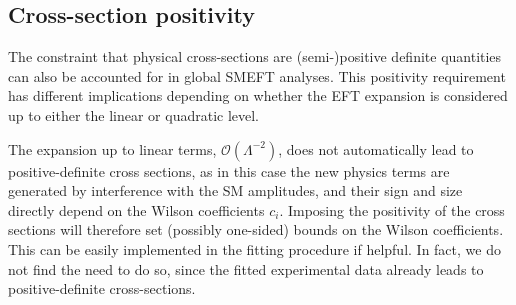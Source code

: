 \subsection{Cross-section positivity}

The constraint that physical cross-sections are (semi-)positive definite
quantities can also be accounted for in global SMEFT analyses. 
This positivity requirement has different implications depending on whether
the EFT expansion is considered up to either the linear or quadratic level. 

The expansion up to linear terms, $\mathcal{O}(\Lambda^{-2})$, does not automatically
lead to positive-definite cross sections, as in this case the new physics terms are
generated by interference with the SM amplitudes, and their sign and size directly
depend on the Wilson coefficients $c_i$. Imposing the positivity of the cross sections
will therefore set (possibly one-sided) bounds on the Wilson coefficients. 
This can be easily implemented in the fitting procedure if helpful.
%
In fact, we do not find the need to do so, since the fitted experimental data
already leads to positive-definite cross-sections.

